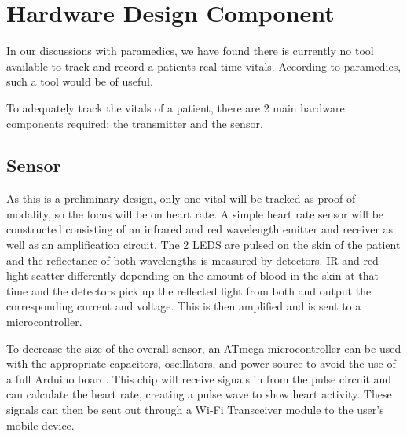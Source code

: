 
\section{Hardware Design Component}

In our discussions with paramedics, we have found there is currently no tool available to track and record a patients real-time vitals. According to paramedics, such a tool would be of useful.

To adequately track the vitals of a patient, there are 2 main hardware components required; the transmitter and the sensor.

\subsection{Sensor}
As this is a preliminary design, only one vital will be tracked as proof of modality, so the focus will be on heart rate.
A simple heart rate sensor will be constructed consisting of an infrared and red wavelength emitter and receiver as well as an amplification circuit.
The 2 LEDS are pulsed on the skin of the patient and the reflectance of both wavelengths is measured by detectors. IR and red light scatter differently
depending on the amount of blood in the skin at that time and the detectors pick up the reflected light from both and output the corresponding current and
voltage. This is then amplified and is sent to a microcontroller.

To decrease the size of the overall sensor, an ATmega microcontroller can be used with the appropriate capacitors, oscillators, and power source to avoid the
use of a full Arduino board. This chip will receive signals in from the pulse circuit and can calculate the heart rate, creating a pulse wave to show heart activity. These signals can then be sent out through a Wi-Fi Transceiver module to the user’s mobile device.
